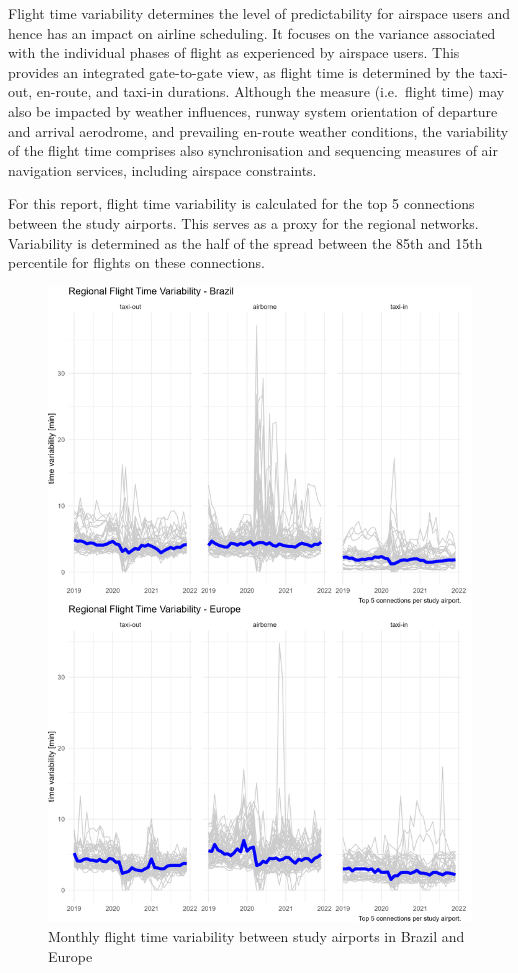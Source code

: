 \documentclass[
  a4paper,
  DIV=11,
  numbers=noendperiod]{scrreprt}
\begin{document}
Flight time variability determines the level of predictability for
airspace users and hence has an impact on airline scheduling. It focuses
on the variance associated with the individual phases of flight as
experienced by airspace users. This provides an integrated gate-to-gate
view, as flight time is determined by the taxi-out, en-route, and
taxi-in durations. Although the measure (i.e.~flight time) may also be
impacted by weather influences, runway system orientation of departure
and arrival aerodrome, and prevailing en-route weather conditions, the
variability of the flight time comprises also synchronisation and
sequencing measures of air navigation services, including airspace
constraints.

For this report, flight time variability is calculated for the top 5
connections between the study airports. This serves as a proxy for the
regional networks. Variability is determined as the half of the spread
between the 85th and 15th percentile for flights on these connections.

\begin{figure}[H]

{\centering \includegraphics[width=8.81in,height=\textheight]{././figures/BRA-EUR-flight-time-var-combined.png}

}

\caption{\label{fig-flight-time-var}Monthly flight time variability
between study airports in Brazil and Europe}

\end{figure}
\end{document}
